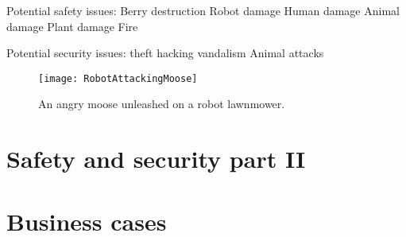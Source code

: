 \documentclass[%
oneside,    %
project,    %
nosummary   %
]{USN-MSc}
\begin{document}
Potential safety issues:
Berry destruction
Robot damage
Human damage
Animal damage
Plant damage
Fire


Potential security issues:
theft
hacking
vandalism
Animal attacks

\begin{figure}[!ht]
  \centering
  \texttt{[image: RobotAttackingMoose]}
  \caption{An angry moose unleashed on a robot lawnmower.}
  \label{fig:anAngryMoose}
\end{figure}

\chapter{Safety and security part II}
\label{ch:safety2}

\chapter{Business cases}
\label{ch:Business}


~\nocite{*}

\cleardoublepage



\end{document}
